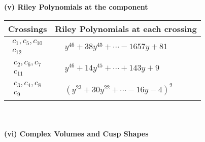 \documentclass[1p]{elsarticle_modified}
\theoremstyle{definition}
\begin{document}
\newpage\renewcommand{\arraystretch}{1}
\flushleft \textbf{(v) Riley Polynomials at the component}\newline \\
\begin{tabular}{m{50pt}|m{274pt}}
Crossings & \hspace{64pt}Riley Polynomials at each crossing \\
\hline $$\begin{aligned}c_{1},c_{5},c_{10}\\c_{12}\end{aligned}$$&$\begin{aligned}
&y^{46}+38 y^{45}+\cdots-1657 y+81
\end{aligned}$\\
\hline $$\begin{aligned}c_{2},c_{6},c_{7}\\c_{11}\end{aligned}$$&$\begin{aligned}
&y^{46}+14 y^{45}+\cdots+143 y+9
\end{aligned}$\\
\hline $$\begin{aligned}c_{3},c_{4},c_{8}\\c_{9}\end{aligned}$$&$\begin{aligned}
&(y^{23}+30 y^{22}+\cdots-16 y-4)^{2}
\end{aligned}$\\
\hline
\end{tabular}\\~\\
\newpage\flushleft \textbf{(vi) Complex Volumes and Cusp Shapes}
\end{document}
